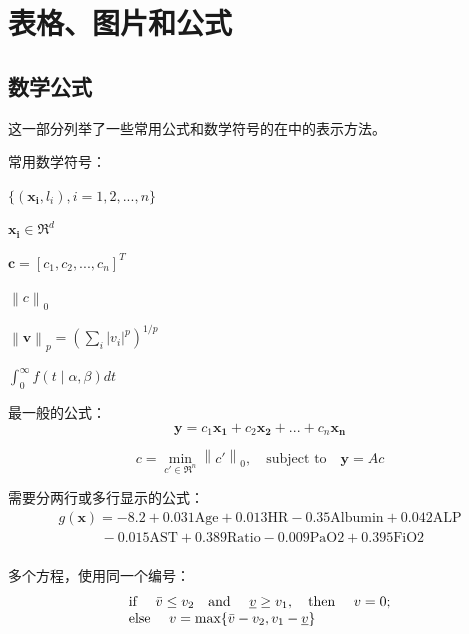 \chapter{表格、图片和公式}
\section{数学公式}
这一部分列举了一些常用公式和数学符号的在中的表示方法。

常用数学符号：

$\{(\mathbf{x_i},l_i),i=1,2,...,n\}$

$\mathbf{x_i}\in \Re ^d$

$\mathbf{c}=[c_1,c_2,...,c_n]^T$

$\left \lVert c \right \rVert_0$

$\left \lVert \mathbf{v} \right \rVert_p = (\sum_i |v_i|^p)^{1/p}$

$\int_{0}^{\infty}f(t\mid\alpha,\beta)dt$

\vskip 20pt

最一般的公式：
\begin{equation}
\label{eq:orginal}
\mathbf{y}=c_1\mathbf{x_1}+c_2\mathbf{x_2}+...+c_n\mathbf{x_n}
\end{equation}

\begin{equation}
\label{eq:spareserep}
c=\mathop{\mathrm{min}}\limits_{c'\in\Re^n} \left \lVert c' \right \rVert_0, \quad \text{subject to} \quad \mathbf{y}=Ac
\end{equation}

\vskip 20pt

需要分两行或多行显示的公式：
\begin{equation}
\begin{array}{l}
g(\mathbf{x})=-8.2+0.031\text{Age}+0.013\text{HR}-0.35\text{Albumin}+0.042\text{ALP}\\
\quad \quad \quad -0.015\text{AST}+0.389\text{Ratio}-0.009\text{PaO2}+0.395\text{FiO2}\\
\end{array}
\end{equation}

\vskip 20pt

多个方程，使用同一个编号：
\begin{equation}\label{eq:definefeature}
   \begin{array}{l}
\text{if \quad}  \bar{v} \le v_2 \text{\quad and \quad} \underline{v} \ge v_1, \text{\quad then \quad} v=0;\\
\text{else \quad} v=\text{max}\{\bar{v}-v_2,v_1-\underline{v}\}
\end{array}
\end{equation}


